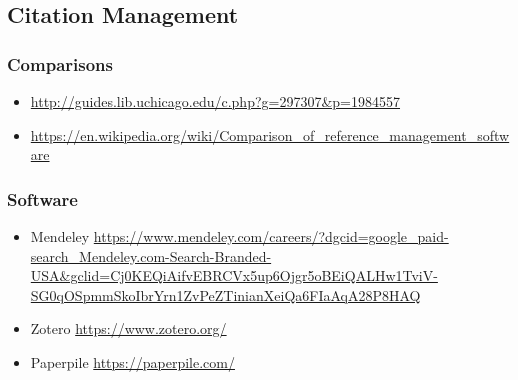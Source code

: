 \documentclass[
]{article}
\providecommand{\tightlist}{%
  \setlength{\itemsep}{0pt}\setlength{\parskip}{0pt}}
\begin{document}
\hypertarget{citation-management}{%
\subsection{Citation Management}\label{citation-management}}

\hypertarget{comparisons}{%
\subsubsection{Comparisons}\label{comparisons}}

\begin{itemize}
\item
  \url{http://guides.lib.uchicago.edu/c.php?g=297307\&p=1984557}
\item
  \url{https://en.wikipedia.org/wiki/Comparison_of_reference_management_software}
\end{itemize}

\hypertarget{software}{%
\subsubsection{Software}\label{software}}

\begin{itemize}
\tightlist
\item
  Mendeley
  \url{https://www.mendeley.com/careers/?dgcid=google_paid-search_Mendeley.com-Search-Branded-USA\&gclid=Cj0KEQiAifvEBRCVx5up6Ojgr5oBEiQALHw1TviV-SG0qOSpmmSkoIbrYrn1ZvPeZTinianXeiQa6FIaAqA28P8HAQ}
\item
  Zotero \url{https://www.zotero.org/}
\item
  Paperpile \url{https://paperpile.com/}
\end{itemize}
\end{document}
